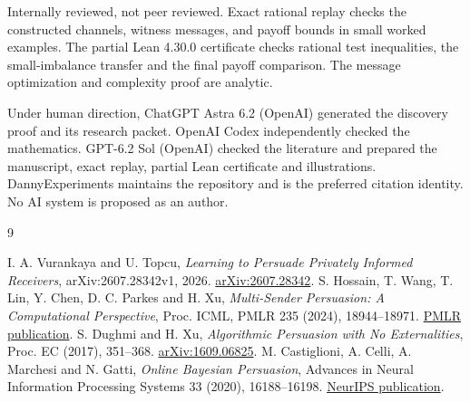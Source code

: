 \documentclass[11pt,a4paper]{amsart}
\begin{document}
Internally reviewed, not peer reviewed. Exact rational replay checks
the constructed channels, witness messages, and payoff bounds in
small worked examples. The partial Lean 4.30.0 certificate checks rational test inequalities,
the small-imbalance transfer and the final payoff comparison. The message
optimization and complexity proof are analytic.

Under human direction, ChatGPT Astra 6.2 (OpenAI) generated the
discovery proof and its research packet. OpenAI Codex independently checked the mathematics.
GPT-6.2 Sol (OpenAI) checked the literature and prepared the
manuscript, exact replay, partial Lean certificate and illustrations.
DannyExperiments maintains the repository and is the preferred
citation identity. No AI system is proposed as an author.

\enlargethispage{3\baselineskip}
\begin{thebibliography}{9}
\raggedright
{}
I. A. Vurankaya and U. Topcu, \emph{Learning to Persuade
Privately Informed Receivers}, arXiv:2607.28342v1, 2026.
\href{https://arxiv.org/abs/2607.28342}{arXiv:2607.28342}.
S. Hossain, T. Wang, T. Lin, Y. Chen, D. C. Parkes and H. Xu,
\emph{Multi-Sender Persuasion: A Computational Perspective},
Proc. ICML, PMLR 235 (2024), 18944--18971.
\href{https://proceedings.mlr.press/v235/hossain24c.html}{PMLR publication}.
S. Dughmi and H. Xu, \emph{Algorithmic Persuasion with No Externalities},
Proc. EC (2017), 351--368.
\href{https://arxiv.org/abs/1609.06825}{arXiv:1609.06825}.
M. Castiglioni, A. Celli, A. Marchesi and N. Gatti,
\emph{Online Bayesian Persuasion}, Advances in Neural Information
Processing Systems 33 (2020), 16188--16198.
\href{https://papers.neurips.cc/paper_files/paper/2020/hash/ba5451d3c91a0f982f103cdbe249bc78-Abstract.html}{NeurIPS publication}.
\end{thebibliography}
\end{document}
